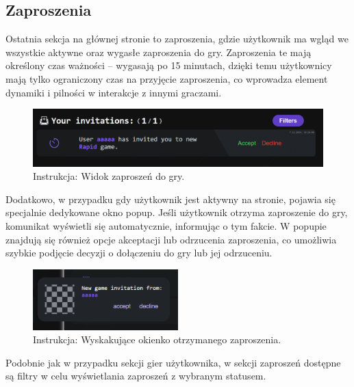 \documentclass[12pt,a4paper]{article}
\begin{document}
\newpage

\subsection{Zaproszenia}
Ostatnia sekcja na głównej stronie to zaproszenia, gdzie użytkownik ma wgląd we wszystkie aktywne oraz wygasłe zaproszenia do gry. Zaproszenia te mają określony czas ważności – wygasają po 15 minutach, dzięki temu użytkownicy mają tylko ograniczony czas na przyjęcie zaproszenia, co wprowadza element dynamiki i pilności w interakcje z innymi graczami.

\vspace{0.5cm}
\begin{figure}[h!]
    \centering
    \includegraphics[width=1\textwidth]{images/ins_min_inv_card.png}
    \caption{Instrukcja: Widok zaproszeń do gry.}
\end{figure}
\vspace{0.5cm}

\noindent
Dodatkowo, w przypadku gdy użytkownik jest aktywny na stronie, pojawia się specjalnie dedykowane okno popup. Jeśli użytkownik otrzyma zaproszenie do gry, komunikat wyświetli się automatycznie, informując o tym fakcie. W popupie znajdują się również opcje akceptacji lub odrzucenia zaproszenia, co umożliwia szybkie podjęcie decyzji o dołączeniu do gry lub jej odrzuceniu.

\vspace{0.5cm}
\begin{figure}[h!]
    \centering
    \includegraphics[width=0.5\textwidth]{images/ins_min_inv_popup.png}
    \caption{Instrukcja: Wyskakujące okienko otrzymanego zaproszenia.}
\end{figure}
\vspace{0.5cm}

\noindent
Podobnie jak w przypadku sekcji gier użytkownika, w sekcji zaproszeń dostępne są filtry w celu wyświetlania zaproszeń z wybranym statusem.
\end{document}
